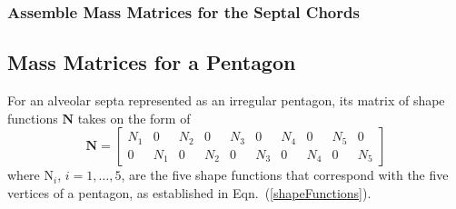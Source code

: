 \subsubsection{Assemble Mass Matrices for the Septal Chords}

\newpage
\subsection{Mass Matrices for a Pentagon}

For an alveolar septa represented as an irregular pentagon, its matrix of shape functions $\mathbf{N}$ takes on the form of
\begin{equation}
\mathbf{N} = 
\begin{bmatrix}
N_1 & 0 & N_2 & 0 & N_3 & 0 & N_4 & 0 & N_5 & 0 \\ 0 & N_1 & 0 & N_2 & 0 & N_3 & 0 & N_4 & 0 & N_5 
\end{bmatrix} 
\label{shape2D}
\end{equation}
where $\mathrm{N}_i$, $i = 1, \ldots, 5$, are the five shape functions that correspond with the five vertices of a pentagon, as established in Eqn.~(\ref{shapeFunctions}).

